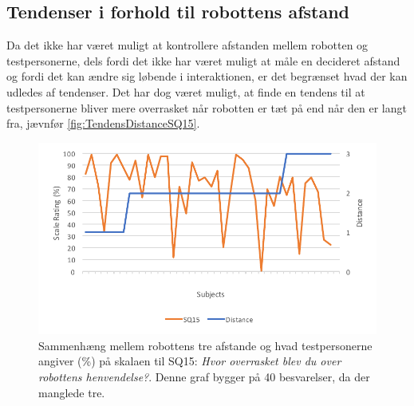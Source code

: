 \subsection{Tendenser i forhold til robottens afstand}
\label{DatabehandlingAfstandTendenser}
%
Da det ikke har været muligt at kontrollere afstanden mellem robotten og testpersonerne, dels fordi det ikke har været muligt at måle en decideret afstand og fordi det kan ændre sig løbende i interaktionen, er det begrænset hvad der kan udledes af tendenser. Det har dog været muligt, at finde en tendens til at testpersonerne bliver mere overrasket når robotten er tæt på end når den er langt fra, jævnfør \autoref{fig:TendensDistanceSQ15}. 
%
\begin{figure}[H]
\centering
\includegraphics[width=\textwidth]{Figure/DatabehandlingSkalaer/TendensHeight/DistanceSQ15}
\caption{Sammenhæng mellem robottens tre afstande og hvad testpersonerne angiver (\%) på skalaen til SQ15: \textit{Hvor overrasket blev du over robottens henvendelse?}. Denne graf bygger på 40 besvarelser, da der manglede tre.}
\label{fig:TendensDistanceSQ15}
\end{figure}
\noindent
%
